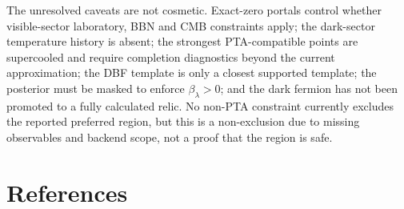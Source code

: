 \documentclass[11pt]{article}
\begin{document}
The unresolved caveats are not cosmetic.  Exact-zero portals control whether visible-sector laboratory, BBN and CMB constraints apply; the dark-sector temperature history is absent; the strongest PTA-compatible points are supercooled and require completion diagnostics beyond the current approximation; the DBF template is only a closest supported template; the posterior must be masked to enforce \(\beta_\lambda>0\); and the dark fermion has not been promoted to a fully calculated relic.  No non-PTA constraint currently excludes the reported preferred region, but this is a non-exclusion due to missing observables and backend scope, not a proof that the region is safe.

\section*{References}
\end{document}
